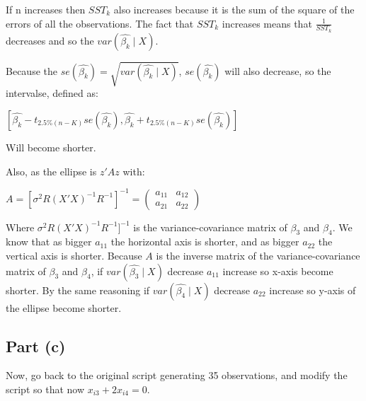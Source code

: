 \documentclass[12pt,a4paper]{article}
\begin{document}
\begin{enumerate}[label=(\roman*)]
If n increases then $SST_k$ also increases because it is the sum of the square of the errors of all the observations. The fact that $SST_k$ increases means that $\frac{1}{SST_k}$ decreases and so the $var(\hat{\beta_k}\mid X)$. 

Because the $se(\hat{\beta_k}) = \sqrt{var(\hat{\beta_k}\mid X)}$, $se(\hat{\beta_k})$ will also decrease, so the intervalse, defined as:

\begin{center}
   $[\hat{\beta_k} - t_{2.5\%(n-K)} se(\hat{\beta_k}), \hat{\beta_k} + t_{2.5\%(n-K)} se(\hat{\beta_k})]$ 
\end{center}

Will become shorter.

Also, as the ellipse is $z'Az $ with:

\begin{center}
    $A = [\sigma^2R(X'X)^{-1}R^{-1}]^{-1} =
\begin{pmatrix}
a_{11} & a_{12}\\
a_{21} & a_{22}
\end{pmatrix}
$
\end{center}

Where $\sigma^2R(X'X)^{-1}R^{-1}]^{-1}$ is the variance-covariance matrix of $\beta_3$ and $\beta_4$. We know that as bigger $a_{11}$ the horizontal axis is shorter, and as bigger $a_{22}$ the vertical axis is shorter. Because $A$ is the inverse matrix of the variance-covariance matrix of $\beta_3$ and $\beta_4$, if $var(\hat{\beta_3}\mid X)$ decrease $a_{11}$ increase so x-axis become shorter. By the same reasoning if $var(\hat{\beta_4}\mid X)$ decrease $a_{22}$ increase so y-axis of the ellipse become shorter.

  
\end{enumerate}

\subsection*{Part (c)}
Now, go back to the original script generating 35 observations, and modify the script so that now $x_{i3} + 2x_{i4} = 0$.
\end{document}
